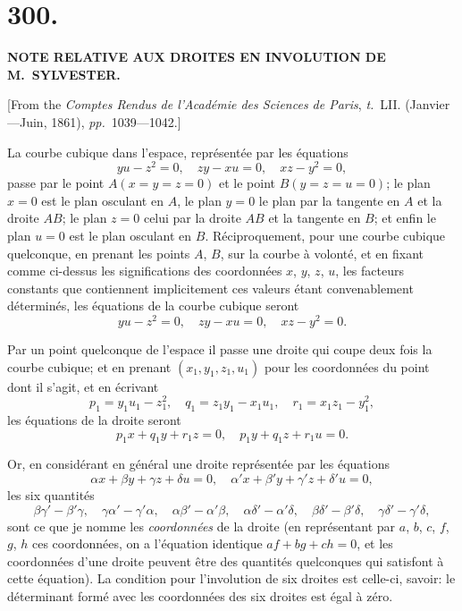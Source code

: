 \documentclass[11pt,a4paper]{article}
\newcommand{\tome}{\textit{t.}}
\newcommand{\pages}{\textit{pp.}}
\begin{document}
\setcounter{page}{1}

\section*{300.}

\begin{center}
\textbf{NOTE RELATIVE AUX DROITES EN INVOLUTION DE M.~SYLVESTER.}
\end{center}

[From the \textit{Comptes Rendus de l'Acad\'{e}mie des Sciences de Paris}, \tome~LII. (Janvier---Juin, 1861), \pages~1039---1042.]

\medskip

La courbe cubique dans l'espace, repr\'{e}sent\'{e}e par les \'{e}quations
\[
yu - z^2 = 0, \quad zy - xu = 0, \quad xz - y^2 = 0,
\]
passe par le point $A(x = y = z = 0)$ et le point $B(y = z = u = 0)$; le plan $x = 0$ est le plan osculant en $A$, le plan $y = 0$ le plan par la tangente en $A$ et la droite $AB$; le plan $z = 0$ celui par la droite $AB$ et la tangente en $B$; et enfin le plan $u = 0$ est le plan osculant en $B$. R\'{e}ciproquement, pour une courbe cubique quelconque, en prenant les points $A$, $B$, sur la courbe \`{a} volont\'{e}, et en fixant comme ci-dessus les significations des coordonn\'{e}es $x$, $y$, $z$, $u$, les facteurs constants que contiennent implicitement ces valeurs \'{e}tant convenablement d\'{e}termin\'{e}s, les \'{e}quations de la courbe cubique seront
\[
yu - z^2 = 0, \quad zy - xu = 0, \quad xz - y^2 = 0.
\]

Par un point quelconque de l'espace il passe une droite qui coupe deux fois la courbe cubique; et en prenant $(x_1, y_1, z_1, u_1)$ pour les coordonn\'{e}es du point dont il s'agit, et en \'{e}crivant
\[
p_1 = y_1 u_1 - z_1^2, \quad q_1 = z_1 y_1 - x_1 u_1, \quad r_1 = x_1 z_1 - y_1^2,
\]
les \'{e}quations de la droite seront
\[
p_1 x + q_1 y + r_1 z = 0, \quad p_1 y + q_1 z + r_1 u = 0.
\]

Or, en consid\'{e}rant en g\'{e}n\'{e}ral une droite repr\'{e}sent\'{e}e par les \'{e}quations
\[
\alpha x + \beta y + \gamma z + \delta u = 0, \quad \alpha' x + \beta' y + \gamma' z + \delta' u = 0,
\]
les six quantit\'{e}s
\[
\beta\gamma' - \beta'\gamma, \quad \gamma\alpha' - \gamma'\alpha, \quad \alpha\beta' - \alpha'\beta, \quad \alpha\delta' - \alpha'\delta, \quad \beta\delta' - \beta'\delta, \quad \gamma\delta' - \gamma'\delta,
\]
sont ce que je nomme les \textit{coordonn\'{e}es} de la droite (en repr\'{e}sentant par $a$, $b$, $c$, $f$, $g$, $h$ ces coordonn\'{e}es, on a l'\'{e}quation identique $af + bg + ch = 0$, et les coordonn\'{e}es d'une droite peuvent \^{e}tre des quantit\'{e}s quelconques qui satisfont \`{a} cette \'{e}quation). La condition pour l'involution de six droites est celle-ci, savoir: le d\'{e}terminant form\'{e} avec les coordonn\'{e}es des six droites est \'{e}gal \`{a} z\'{e}ro.
\end{document}
